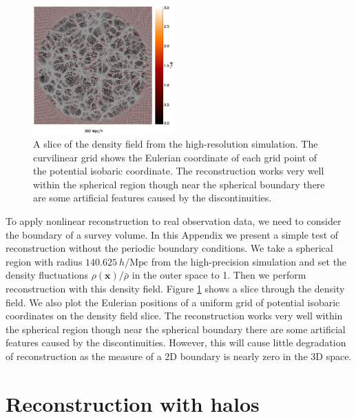 \documentclass[aps,prx,twocolumn,superscriptaddress,groupedaddress,nofootinbib,amsfont]{revtex4}  %
\newcommand{\mr}{\mathrm}
\newcommand{\bmx}{\bm{x}}
\begin{document}
\begin{figure}[tbp]
\vspace{-0.7cm}
\begin{center}
\includegraphics[width=0.48\textwidth]{map0512-0256-all.eps}
\end{center}
\vspace{-0.7cm}
\caption{A slice of the density field from the high-resolution simulation. 
The curvilinear grid shows the Eulerian coordinate of each grid point of the 
potential isobaric coordinate. The reconstruction works very well within the 
spherical region though near the spherical boundary there are some artificial 
features caused by the discontinuities.}
\label{fig:mask}
\end{figure}

To apply nonlinear reconstruction to real observation data, we need to consider
the boundary of a survey volume. In this Appendix  we present a simple test of 
reconstruction without the periodic boundary conditions. We take a spherical 
region with radius $140.625\ h/\mr{Mpc}$ from the high-precision simulation and
set the density fluctuations $\rho(\bmx)/\bar{\rho}$ in the outer space to 1.
Then we perform reconstruction with this density field.
Figure \ref{fig:mask} shows a slice through the density field. We also plot the 
Eulerian positions of a uniform grid of potential isobaric coordinates on the
density field slice. The reconstruction works very well within the spherical
region though near the spherical boundary there are some artificial features
caused by the discontinuities. However, this will cause little degradation of 
reconstruction as the measure of a 2D boundary is nearly zero in the 3D space.

\section{Reconstruction with halos}
\label{appendix:D}
\end{document}
